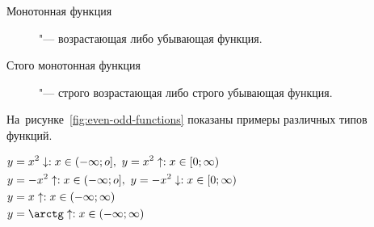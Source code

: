 \documentclass[]{scrartcl}
\begin{document}
\begin{description}
	\item[Монотонная функция]"--- возрастающая либо убывающая функция.
\end{description}
\begin{description}
	\item[Стого монотонная функция]"--- строго возрастающая либо строго убывающая функция.
\end{description}
На~рисунке~\ref{fig:even-odd-functions} показаны примеры различных типов функций.
\begin{Thexmpl}
	$\begin{aligned}
	y&=x^2\downarrow:x\in (-\infty;o],\ y=x^2\uparrow:x\in [0;\infty)\\
	y&=-x^2\uparrow:x\in (-\infty;o],\ y=-x^2\downarrow:x\in [0;\infty)\\
	y&=x\uparrow:x\in (-\infty;\infty)\\
	y&=\arctg \uparrow:x\in (-\infty;\infty)\\
	\end{aligned}$
\end{Thexmpl}
\end{document}

